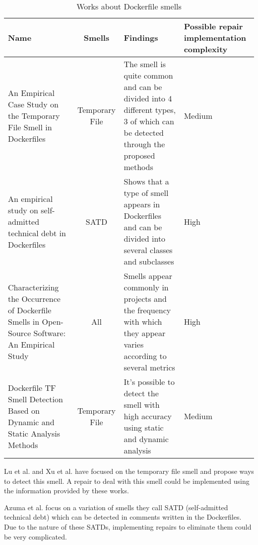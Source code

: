 \begin{table}[H]
    \centering
    \begin{tabular}{|p{}|c|p{}|p{}|}
        \hline \textbf{Name} & \textbf{Smells} & \textbf{Findings} & \textbf{Possible repair implementation complexity} \\
        \hline An Empirical Case Study on the Temporary File Smell in Dockerfiles \cite{luEmpiricalCaseStudy2019} & Temporary File & The smell is quite common and can be divided into 4 different types, 3 of which can be detected through the proposed methods & Medium \\
        \hline An empirical study on self-admitted technical debt in Dockerfiles \cite{azumaEmpiricalStudySelfadmitted2022} & SATD & Shows that a type of smell appears in Dockerfiles and can be divided into several classes and subclasses & High \\
        \hline Characterizing the Occurrence of Dockerfile Smells in Open-Source Software: An Empirical Study \cite{wuCharacterizingOccurrenceDockerfile2020} & All & Smells appear commonly in projects and the frequency with which they appear varies according to several metrics & High \\
        \hline Dockerfile TF Smell Detection Based on Dynamic and Static Analysis Methods \cite{xuDockerfileTFSmell2019} & Temporary File & It's possible to detect the smell with high accuracy using static and dynamic analysis & Medium \\
        \hline
    \end{tabular} 
    \caption{Works about Dockerfile smells}
    \label{tab:works_dockerfile_smells}
\end{table}


Lu et al. \cite{luEmpiricalCaseStudy2019} and Xu et al. \cite{xuDockerfileTFSmell2019} have focused on the temporary file smell and propose ways to detect this smell. A repair to deal with this smell could be implemented using the information provided by these works.

Azuma et al. \cite{azumaEmpiricalStudySelfadmitted2022} focus on a variation of smells they call SATD (self-admitted technical debt) which can be detected in comments written in the Dockerfiles. Due to the nature of these SATDs, implementing repairs to eliminate them could be very complicated.

